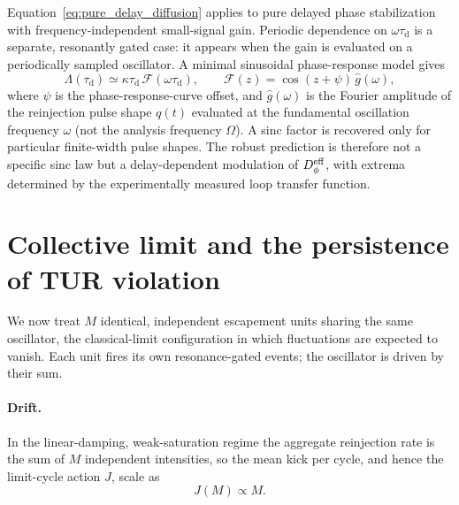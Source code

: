 \documentclass[aps,pre,reprint,amsmath,amssymb,floatfix,nofootinbib]{revtex4-2}
\newcommand{\Dphi}{D_{\phi}}
\newcommand{\taud}{\tau_{\mathrm{d}}}
\begin{document}
Equation~\eqref{eq:pure_delay_diffusion} applies to pure delayed phase
stabilization with frequency-independent small-signal gain. Periodic
dependence on $\omega\taud$ is a separate, resonantly gated case: it appears
when the gain is evaluated on a periodically sampled oscillator. A minimal
sinusoidal phase-response model gives
\begin{equation}
  \Lambda(\taud)
  \simeq
  \kappa\taud\,\mathcal{F}(\omega\taud),
  \qquad
  \mathcal{F}(z)=\cos(z+\psi)\,\widehat g(\omega),
  \label{eq:delaydiff_sinusoidal}
\end{equation}
where $\psi$ is the phase-response-curve offset, and $\widehat g(\omega)$
is the Fourier amplitude of the reinjection pulse shape $q(t)$ evaluated
at the fundamental oscillation frequency $\omega$ (not the analysis
frequency $\Omega$). A sinc factor is recovered only for particular
finite-width pulse shapes. The robust prediction is therefore not a
specific sinc law but a delay-dependent modulation of $\Dphi^{\rm eff}$,
with extrema determined by the experimentally measured loop transfer
function.

\section{Collective limit and the persistence of TUR violation}
\label{sec:collective}

We now treat $M$ identical, independent escapement units sharing the same
oscillator, the classical-limit configuration in which fluctuations are
expected to vanish. Each unit fires its own resonance-gated events; the
oscillator is driven by their sum.

\paragraph*{Drift.}
In the linear-damping, weak-saturation regime the aggregate reinjection
rate is the sum of $M$ independent intensities, so the mean kick per
cycle, and hence the limit-cycle action $J$, scale as
\begin{equation}
  J(M) \propto M .
  \label{eq:action}
\end{equation}
\end{document}
